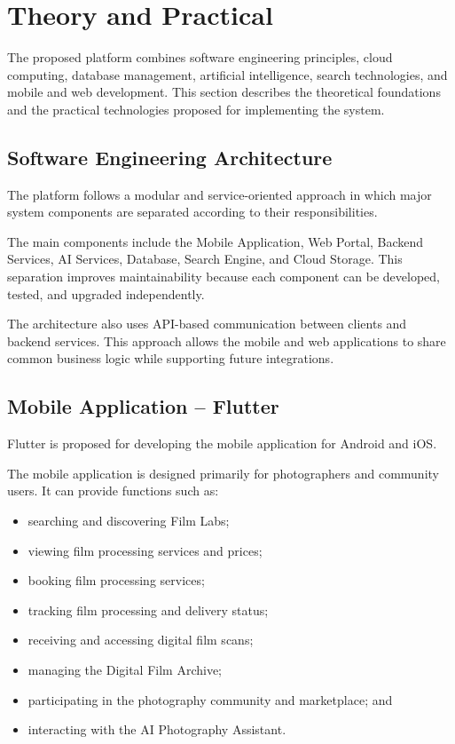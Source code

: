 
\section{Theory and Practical}

The proposed platform combines software engineering principles, cloud
computing, database management, artificial intelligence, search technologies,
and mobile and web development. This section describes the theoretical
foundations and the practical technologies proposed for implementing the
system.

\subsection{Software Engineering Architecture}

The platform follows a modular and service-oriented approach in which major
system components are separated according to their responsibilities.

The main components include the Mobile Application, Web Portal, Backend
Services, AI Services, Database, Search Engine, and Cloud Storage. This
separation improves maintainability because each component can be developed,
tested, and upgraded independently.

The architecture also uses API-based communication between clients and
backend services. This approach allows the mobile and web applications to
share common business logic while supporting future integrations.

\subsection{Mobile Application -- Flutter}

Flutter is proposed for developing the mobile application for Android and
iOS.

The mobile application is designed primarily for photographers and community
users. It can provide functions such as:

\begin{itemize}
    \item searching and discovering Film Labs;
    \item viewing film processing services and prices;
    \item booking film processing services;
    \item tracking film processing and delivery status;
    \item receiving and accessing digital film scans;
    \item managing the Digital Film Archive;
    \item participating in the photography community and marketplace; and
    \item interacting with the AI Photography Assistant.
\end{itemize}

